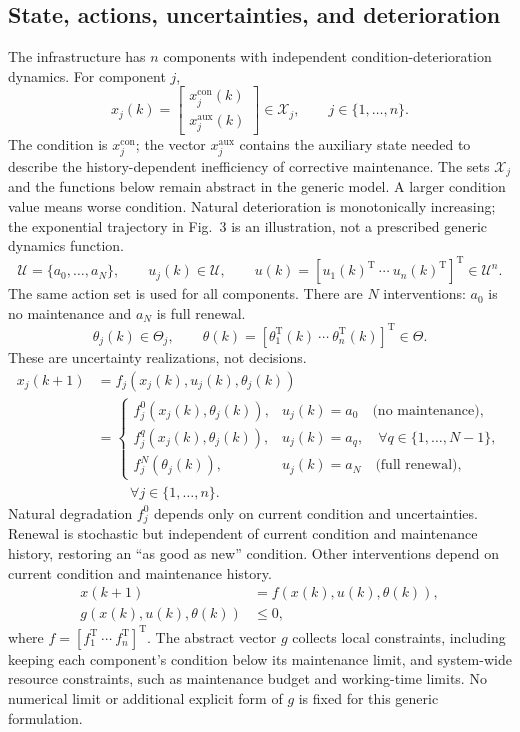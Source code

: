 \documentclass{article}
\begin{document}
\subsection*{State, actions, uncertainties, and deterioration}
The infrastructure has $n$ components with independent condition-deterioration dynamics. For component $j$,
\[
x_j(k)=\begin{bmatrix}x_j^{\mathrm{con}}(k)\\x_j^{\mathrm{aux}}(k)\end{bmatrix}\in\mathcal X_j,
\qquad j\in\{1,\ldots,n\}.
\]
The condition is $x_j^{\mathrm{con}}$; the vector $x_j^{\mathrm{aux}}$ contains the auxiliary state needed to describe the history-dependent inefficiency of corrective maintenance. The sets $\mathcal X_j$ and the functions below remain abstract in the generic model. A larger condition value means worse condition. Natural deterioration is monotonically increasing; the exponential trajectory in Fig.~3 is an illustration, not a prescribed generic dynamics function.
\[
\mathcal U=\{a_0,\ldots,a_N\},\qquad u_j(k)\in\mathcal U,
\qquad u(k)=[u_1(k)^{\mathrm T}\ \cdots\ u_n(k)^{\mathrm T}]^{\mathrm T}\in\mathcal U^n.
\]
The same action set is used for all components. There are $N$ interventions: $a_0$ is no maintenance and $a_N$ is full renewal.
\[
\theta_j(k)\in\Theta_j,\qquad
\theta(k)=[\theta_1^{\mathrm T}(k)\ \cdots\ \theta_n^{\mathrm T}(k)]^{\mathrm T}\in\Theta.
\]
These are uncertainty realizations, not decisions.
\begin{equation}
\begin{aligned}
x_j(k+1)&=f_j(x_j(k),u_j(k),\theta_j(k))\\
&=\begin{cases}
f_j^0(x_j(k),\theta_j(k)),&u_j(k)=a_0\quad\text{(no maintenance)},\\
f_j^q(x_j(k),\theta_j(k)),&u_j(k)=a_q,\quad\forall q\in\{1,\ldots,N-1\},\\
f_j^N(\theta_j(k)),&u_j(k)=a_N\quad\text{(full renewal)},
\end{cases}\\[-2pt]
&\hspace{1cm}\forall j\in\{1,\ldots,n\}.
\end{aligned}\tag{1}
\end{equation}
Natural degradation $f_j^0$ depends only on current condition and uncertainties. Renewal is stochastic but independent of current condition and maintenance history, restoring an ``as good as new'' condition. Other interventions depend on current condition and maintenance history.
\begin{align}
x(k+1)&=f(x(k),u(k),\theta(k)), \tag{2}\\
g(x(k),u(k),\theta(k))&\leq0, \tag{3}
\end{align}
where $f=[f_1^{\mathrm T}\ \cdots\ f_n^{\mathrm T}]^{\mathrm T}$. The abstract vector $g$ collects local constraints, including keeping each component's condition below its maintenance limit, and system-wide resource constraints, such as maintenance budget and working-time limits. No numerical limit or additional explicit form of $g$ is fixed for this generic formulation.
\end{document}
